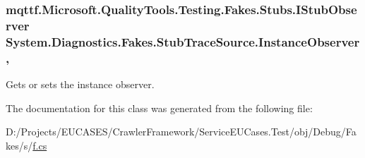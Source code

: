 \hypertarget{class_system_1_1_diagnostics_1_1_fakes_1_1_stub_trace_source_a2a8e7decd2bb4aac3d6e15f5011238c3}{
\subsubsection[{Instance\-Observer}]{\setlength{\rightskip}{0pt plus 5cm}mqttf.\-Microsoft.\-Quality\-Tools.\-Testing.\-Fakes.\-Stubs.\-I\-Stub\-Observer System.\-Diagnostics.\-Fakes.\-Stub\-Trace\-Source.\-Instance\-Observer\hspace{0.3cm}{\ttfamily [get]}, {\ttfamily [set]}}}\label{class_system_1_1_diagnostics_1_1_fakes_1_1_stub_trace_source_a2a8e7decd2bb4aac3d6e15f5011238c3}


Gets or sets the instance observer.



The documentation for this class was generated from the following file\-:\begin{DoxyCompactItemize}
\item 
D\-:/\-Projects/\-E\-U\-C\-A\-S\-E\-S/\-Crawler\-Framework/\-Service\-E\-U\-Cases.\-Test/obj/\-Debug/\-Fakes/s/\hyperlink{s_2f_8cs}{f.\-cs}\end{DoxyCompactItemize}
